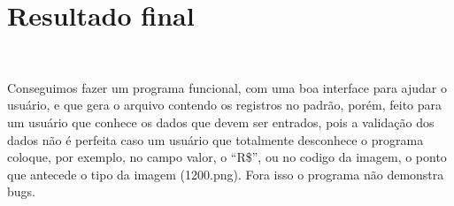 \documentclass{article}
\begin{document}
\section*{Resultado final}\

   Conseguimos fazer um programa funcional, com uma boa interface para ajudar o usuário, e que gera o arquivo contendo os registros no padrão, porém, feito para um usuário que conhece os dados que devem ser entrados, pois a validação dos dados não é perfeita caso um usuário que totalmente desconhece o programa coloque, por exemplo, no campo valor, o ``R\$'', ou no codigo da imagem, o ponto que antecede o tipo da imagem (1200.png). Fora isso o programa não demonstra bugs.
\end{document}
